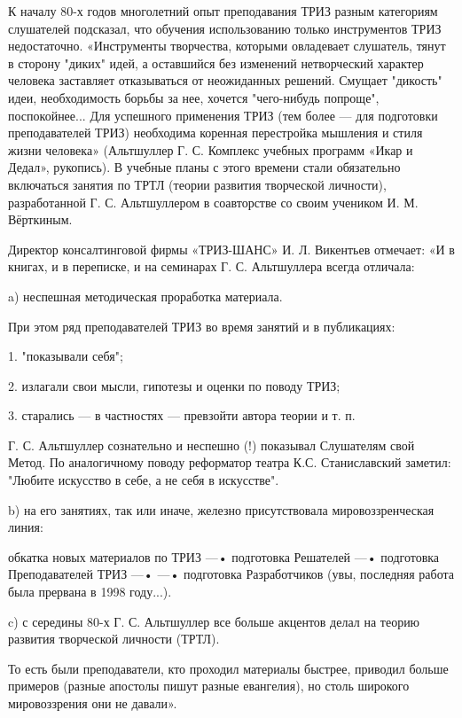 К  началу  80-х  годов   многолетний  опыт  преподавания  ТРИЗ  разным
категориям  слушателей подсказал,  что  обучения использованию  только
инструментов  ТРИЗ  недостаточно.  «Инструменты  творчества,  которыми
овладевает слушатель, тянут  в сторону "диких" идей,  а оставшийся без
изменений  нетворческий характер  человека заставляет  отказываться от
неожиданных решений.  Смущает "дикость" идеи, необходимость  борьбы за
нее,  хочется  "чего-нибудь  попроще",  поспокойнее...  Для  успешного
применения  ТРИЗ  (тем более  —  для  подготовки преподавателей  ТРИЗ)
необходима  коренная  перестройка  мышления и  стиля  жизни  человека»
(Альтшуллер Г. С. Комплекс учебных программ «Икар и Дедал», рукопись).
В учебные планы  с этого времени стали  обязательно включаться занятия
по  ТРТЛ (теории  развития творческой  личности), разработанной  Г. С.
Альтшуллером в соавторстве со своим учеником И. М. Вёрткиным.


Директор консалтинговой фирмы «ТРИЗ-ШАНС» И. Л. Викентьев отмечает: «И
в  книгах, и  в переписке,  и на  семинарах Г.  С. Альтшуллера  всегда
отличала:

a) неспешная методическая проработка материала.

При этом ряд преподавателей ТРИЗ во время занятий и в
публикациях:

1. "показывали себя";

2. излагали свои мысли, гипотезы и оценки по поводу ТРИЗ;

3. старались — в частностях — превзойти автора теории и т. п.

Г. С. Альтшуллер сознательно и  неспешно (!) показывал Слушателям свой
Метод.  По аналогичному  поводу реформатор  театра К.С.  Станиславский
заметил: "Любите искусство в себе, а не себя в искусстве".

b) на его занятиях, так или иначе, железно присутствовала
мировоззренческая линия:

обкатка новых материалов по ТРИЗ —• подготовка
Решателей —• подготовка Преподавателей ТРИЗ —•
—• подготовка Разработчиков (увы, последняя работа
была прервана в 1998 году...).

c)  с середины  80-х Г.  С. Альтшуллер  все больше  акцентов делал  на
теорию развития творческой личности (ТРТЛ).

То есть  были преподаватели, кто проходил  материалы быстрее, приводил
больше  примеров (разные  апостолы пишут  разные евангелия),  но столь
широкого мировоззрения они не давали».

